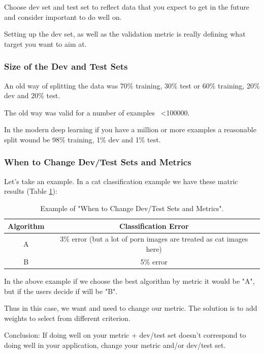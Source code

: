 Choose dev set and test set to reflect data that you expect to get in the future and consider important to do well on.

Setting up the dev set, as well as the validation metric is really defining what target you want to aim at.

\subsubsection{Size of the Dev and Test Sets}
An old way of splitting the data was 70\% training, 30\% test or 60\% training, 20\% dev and 20\% test.

The old way was valid for a number of examples ~<100000.

In the modern deep learning if you have a million or more examples a reasonable split wound be 98\% training, 1\% dev and 1\% test.

\subsubsection{When to Change Dev/Test Sets and Metrics}
Let's take an example. In a cat classification example we have these matric results (Table \ref{when2change}):

\begin{table}[!htbp]
    \centering
    \begin{tabular}{c|c}
        \hline
        Algorithm &  Classification Error\\
        \hline
        A & 3\% error (but a lot of porn images are treated as cat images here)\\
        B & 5\% error\\
        \hline
    \end{tabular}
    \caption{Example of "When to Change Dev/Test Sets and Metrics".}
    \label{when2change}
\end{table}

In the above example if we choose the best algorithm by metric it would be "A", but if the users decide if will be "B".

Thus in this case, we want and need to change our metric. The solution is to add weights to select from different criterion.

Conclusion: If doing well on your metric + dev/test set doesn't correspond to doing well in your application, change your metric and/or dev/test set.

